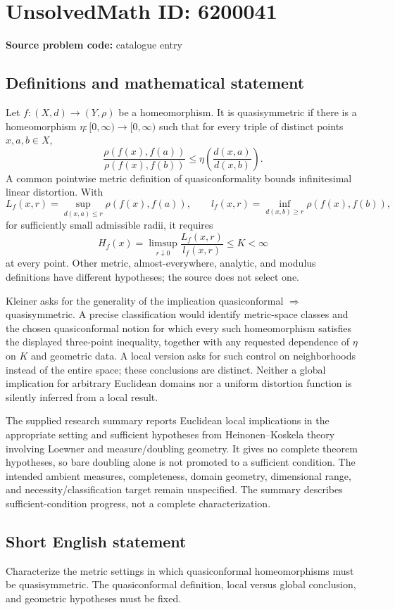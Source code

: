 \documentclass[11pt]{article}
\begin{document}
\section*{UnsolvedMath ID: 6200041}
\textbf{Source problem code:} catalogue entry
\subsection{Definitions and mathematical statement}
Let \(f:(X,d)\to(Y,\rho)\) be a homeomorphism. It is quasisymmetric if there is a homeomorphism \(\eta:[0,\infty)\to[0,\infty)\) such that for every triple of distinct points \(x,a,b\in X\),
\[
\frac{\rho(f(x),f(a))}{\rho(f(x),f(b))}
\le\eta\left(\frac{d(x,a)}{d(x,b)}\right).
\]
A common pointwise metric definition of quasiconformality bounds infinitesimal linear distortion. With
\[
L_f(x,r)=\sup_{d(x,a)\le r}\rho(f(x),f(a)),\qquad
l_f(x,r)=\inf_{d(x,b)\ge r}\rho(f(x),f(b)),
\]
for sufficiently small admissible radii, it requires
\[
H_f(x)=\limsup_{r\downarrow0}\frac{L_f(x,r)}{l_f(x,r)}\le K<\infty
\]
at every point. Other metric, almost-everywhere, analytic, and modulus definitions have different hypotheses; the source does not select one.

Kleiner asks for the generality of the implication quasiconformal \(\Rightarrow\) quasisymmetric. A precise classification would identify metric-space classes and the chosen quasiconformal notion for which every such homeomorphism satisfies the displayed three-point inequality, together with any requested dependence of \(\eta\) on \(K\) and geometric data. A local version asks for such control on neighborhoods instead of the entire space; these conclusions are distinct. Neither a global implication for arbitrary Euclidean domains nor a uniform distortion function is silently inferred from a local result.

The supplied research summary reports Euclidean local implications in the appropriate setting and sufficient hypotheses from Heinonen--Koskela theory involving Loewner and measure/doubling geometry. It gives no complete theorem hypotheses, so bare doubling alone is not promoted to a sufficient condition. The intended ambient measures, completeness, domain geometry, dimensional range, and necessity/classification target remain unspecified. The summary describes sufficient-condition progress, not a complete characterization.
\subsection{Short English statement}
Characterize the metric settings in which quasiconformal homeomorphisms must be quasisymmetric. The quasiconformal definition, local versus global conclusion, and geometric hypotheses must be fixed.
\end{document}

